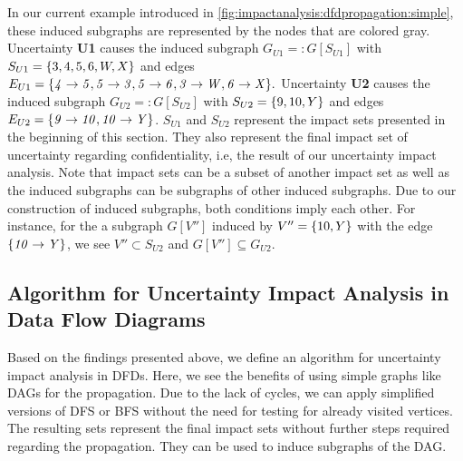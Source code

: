 In our current example introduced in \autoref{fig:impactanalysis:dfdpropagation:simple}, these induced subgraphs are represented by the nodes that are colored gray.
Uncertainty \textbf{U1} causes the induced subgraph $G_{U1} =: G[S_{U1}]$ with $S_{U1} = \{ 3, 4, 5, 6, W, X \}$ and edges $E_{U1} = \{ \mathit{4} \rightarrow \mathit{5}, \mathit{5} \rightarrow \mathit{3}, \mathit{5} \rightarrow \mathit{6}, \mathit{3} \rightarrow \mathit{W}, \mathit{6} \rightarrow \mathit{X} \}.$
Uncertainty \textbf{U2} causes the induced subgraph $G_{U2} =: G[S_{U2}]$ with $S_{U2} = \{ 9, 10, Y \}$ and edges $E_{U2} = \{ \mathit{9} \rightarrow \mathit{10},\mathit{10} \rightarrow \mathit{Y} \}$.
$S_{U1}$ and $S_{U2}$ represent the impact sets presented in the beginning of this section.
They also represent the final impact set of uncertainty regarding confidentiality, i.e, the result of our uncertainty impact analysis.
Note that impact sets can be a subset of another impact set as well as the induced subgraphs can be subgraphs of other induced subgraphs.
Due to our construction of induced subgraphs, both conditions imply each other.
For instance, for the a subgraph $G[V'']$ induced by $V'' = \{ 10,Y \}$ with the edge $\{ \mathit{10} \rightarrow \mathit{Y} \}$, we see $V'' \subset S_{U2}$ and $G[V''] \subseteq G_{U2}$.



\subsection{Algorithm for Uncertainty Impact Analysis in Data Flow Diagrams}

Based on the findings presented above, we define an algorithm for uncertainty impact analysis in \acp{DFD}.
Here, we see the benefits of using simple graphs like \acp{DAG} for the propagation.
Due to the lack of cycles, we can apply simplified versions of \acf{DFS} or \acf{BFS} \cite{knuth_art_1997} without the need for testing for already visited vertices.
The resulting sets represent the final impact sets without further steps required regarding the propagation. 
They can be used to induce subgraphs of the \ac{DAG}.

